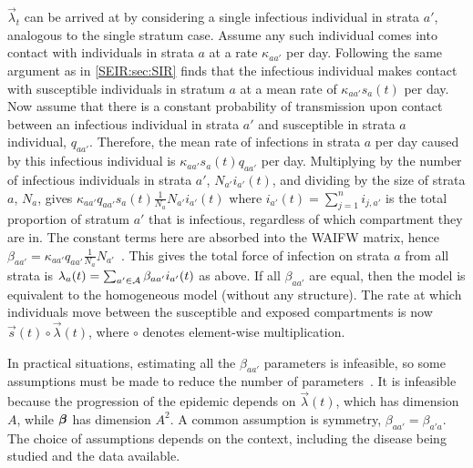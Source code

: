 \documentclass[thesis.tex]{subfiles}
\begin{document}
$\vec{\lambda}_t$ can be arrived at by considering a single infectious individual in strata $a'$, analogous to the single stratum case.
Assume any such individual comes into contact with individuals in strata $a$ at a rate $\kappa_{aa'}$ per day.
Following the same argument as in \cref{SEIR:sec:SIR} finds that the infectious individual makes contact with susceptible individuals in stratum $a$ at a mean rate of $\kappa_{aa'} s_a(t)$ per day.
Now assume that there is a constant probability of transmission upon contact between an infectious individual in strata $a'$ and susceptible in strata $a$ individual, $q_{aa'}$.
Therefore, the mean rate of infections in strata $a$ per day caused by this infectious individual is $\kappa_{aa'} s_a(t) q_{aa'}$ per day.
Multiplying by the number of infectious individuals in strata $a'$, $N_{a'} i_{a'}(t)$, and dividing by the size of strata $a$, $N_a$, gives $\kappa_{aa'} q_{aa'} s_a(t) \frac{1}{N_a} N_{a'} i_{a'}(t)$ where $i_{a'}(t) = \sum_{j=1}^n i_{j,a'}$ is the total proportion of stratum $a'$ that is infectious, regardless of which compartment they are in.
The constant terms here are absorbed into the WAIFW matrix, hence $\beta_{aa'} = \kappa_{aa'} q_{aa'} \frac{1}{N_a} N_{a'}$~\autocite[section 9.2]{diekmannMathematical}.
This gives the total force of infection on strata $a$ from all strata is $\lambda_a(t) = \sum_{a' \in \mathcal{A}} \beta_{aa'} i_{a'}(t)$ as above.
If all $\beta_{aa'}$ are equal, then the model is equivalent to the homogeneous model (\ie without any structure).
The rate at which individuals move between the susceptible and exposed compartments is now $\vec{s}(t) \circ \vec\lambda(t)$, where $\circ$ denotes element-wise multiplication.

In practical situations, estimating all the $\beta_{aa'}$ parameters is infeasible, so some assumptions must be made to reduce the number of parameters~\autocite[176]{andersonInfectious}.
It is infeasible because the progression of the epidemic depends on $\vec{\lambda}(t)$, which has dimension $A$, while $\bm{\beta}$ has dimension $A^2$.
A common assumption is symmetry, \ie $\beta_{aa'} = \beta_{a'a}$.
The choice of assumptions depends on the context, including the disease being studied and the data available.
\end{document}
